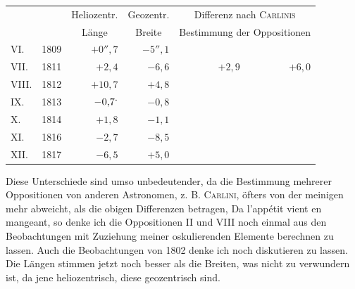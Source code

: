 \begin{center}
\begingroup\small\setlength{\tabcolsep}{5pt}
\begin{tabular}{@{}lr r r r r@{}}
&&\multicolumn{1}{c}{Heliozentr.}&\multicolumn{1}{c}{Geozentr.}&\multicolumn{2}{c}{Differenz nach \textsc{Carlinis}}\\
&&\multicolumn{1}{c}{Länge}&\multicolumn{1}{c}{Breite}&\multicolumn{2}{c}{Bestimmung der Oppositionen}\\[3pt]
VI.&1809&\(+0''{,}7\)&\(-5''{,}1\)&&\\
VII.&1811&\(+2{,}4\)&\(-6{,}6\)&\(+2{,}9\)&\(+6{,}0\)\\
VIII.&1812&\(+10{,}7\)&\(+4{,}8\)&&\\
IX.&1813&\(-0{,}7\mathpunct{\raisebox{1ex}{.}}\)&\(-0{,}8\)&&\\
X.&1814&\(+1{,}8\)&\(-1{,}1\)&&\\
XI.&1816&\(-2{,}7\)&\(-8{,}5\)&&\\
XII.&1817&\(-6{,}5\)&\(+5{,}0\)&&
\end{tabular}
\endgroup
\end{center}
\par Diese Unterschiede sind umso unbedeutender, da die Bestimmung mehrerer Oppositionen von anderen Astronomen, z. B. \textsc{Carlini}, öfters von der meinigen mehr abweicht, als die obigen Differenzen betragen, Da l’appétit vient en mangeant, so denke ich die Oppositionen II und VIII noch einmal aus den Beobachtungen mit Zuziehung meiner oskulierenden Elemente berechnen zu lassen. Auch die Beobachtungen von 1802 denke ich noch diskutieren zu lassen. Die Längen stimmen jetzt noch besser als die Breiten, was nicht zu verwundern ist, da jene heliozentrisch, diese geozentrisch sind.
\par
